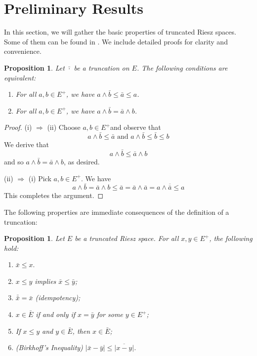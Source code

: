 \documentclass{birkau}
\numberwithin{equation}{section}
\theoremstyle{plain}
\newtheorem{proposition}[theorem]{Proposition}
\theoremstyle{definition}
\begin{document}
\section{Preliminary Results}
In this section, we will gather the basic properties of truncated Riesz
spaces. Some of them can be found in \cite{Boulstructuretheorem}.  We include detailed proofs for
clarity and convenience.
\begin{proposition}
	Let $\bar{\cdot}$ be a truncation on $E$. The following conditions are equivalent:
	\begin{enumerate}
		\item[(i)] For all $a,b\in E^{+}$, we have $a\wedge\bar{b}\leq\bar{a}\leq a $.
		
		\item[(ii)] For all $a,b\in E^{+}$, we have $a\wedge\bar{b}=\bar{a}\wedge b$.
	\end{enumerate}
\end{proposition}
\begin{proof}
	(i) $\Rightarrow$ (ii) Choose $a,b\in E^{+}$and observe that%
	\[
	a\wedge\bar{b}\leq\bar{a}\text{ and }a\wedge\bar{b}\leq\bar{b}\leq b
	\]
	We derive that%
	\[
	a\wedge\bar{b}\leq\bar{a}\wedge b
	\]
	and so $a\wedge\bar{b}=\bar{a}\wedge b$, as desired.
	
	(ii) $\Rightarrow$ (i) Pick $a,b\in E^{+}$. We have%
	\[
	a\wedge\bar{b}=\bar{a}\wedge b\leq\bar{a}=\bar{a}\wedge\bar{a}=a\wedge
	\overline{\bar{a}}\leq a
	\]
	This completes the argument.
\end{proof}
\bigskip
The following properties are immediate consequences of the definition of a truncation:
\begin{proposition}
	Let $E$ be a truncated Riesz space. For all $x,y \in E^{+}$, the following hold:
	\begin{enumerate}
		\item $\bar{x}\leq x.$
		\item $x\leq y$ implies $\bar{x}\leq\bar{y}$;
		\item $\bar{\bar{x}}=\bar{x}$ (idempotency);
		\item $x\in\bar{E}$ if and only if $x=\bar{y}$ for some $y\in E^{+}$;
		\item If $x\leq y$ and $y\in\bar{E}$, then $x\in\bar{E}$;
		\item (Birkhoff's Inequality) $\left\vert \bar{x}-\bar{y}\right\vert
		\leq\overline{\left\vert x-y\right\vert }$.
	\end{enumerate}
\end{proposition}
\end{document}
